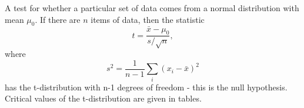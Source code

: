 A test for whether a particular set of data comes from a normal
distribution with mean $ \mu _0 . $ If there are $n$ items of data, then
the statistic
\[ 
t = \frac{\bar{x} - \mu _0 } { s/ \sqrt{n}}, 
\]
where 
\[ 
s ^2 = \frac{1}{n -1} \sum _{i} ( x_{i} - \bar{x} ) ^2 
\]
has the t-distribution with n-1 degrees of freedom - this is the null
hypothesis.  Critical values of the t-distribution are given in
tables.